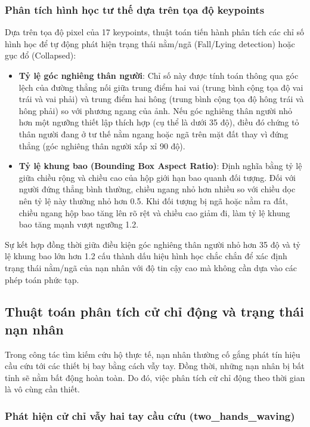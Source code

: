 \subsubsection{Phân tích hình học tư thế dựa trên tọa độ keypoints}

Dựa trên tọa độ pixel của 17 keypoints, thuật toán tiến hành phân tích các chỉ số hình học để tự động phát hiện trạng thái nằm/ngã (Fall/Lying detection) hoặc gục đổ (Collapsed):

\begin{itemize}
    \item \textbf{Tỷ lệ góc nghiêng thân người}: Chỉ số này được tính toán thông qua góc lệch của đường thẳng nối giữa trung điểm hai vai (trung bình cộng tọa độ vai trái và vai phải) và trung điểm hai hông (trung bình cộng tọa độ hông trái và hông phải) so với phương ngang của ảnh. Nếu góc nghiêng thân người nhỏ hơn một ngưỡng thiết lập thích hợp (cụ thể là dưới 35 độ), điều đó chứng tỏ thân người đang ở tư thế nằm ngang hoặc ngã trên mặt đất thay vì đứng thẳng (góc nghiêng thân người xấp xỉ 90 độ).
    \item \textbf{Tỷ lệ khung bao (Bounding Box Aspect Ratio)}: Định nghĩa bằng tỷ lệ giữa chiều rộng và chiều cao của hộp giới hạn bao quanh đối tượng. Đối với người đứng thẳng bình thường, chiều ngang nhỏ hơn nhiều so với chiều dọc nên tỷ lệ này thường nhỏ hơn 0.5. Khi đối tượng bị ngã hoặc nằm ra đất, chiều ngang hộp bao tăng lên rõ rệt và chiều cao giảm đi, làm tỷ lệ khung bao tăng mạnh vượt ngưỡng 1.2.
\end{itemize}

Sự kết hợp đồng thời giữa điều kiện góc nghiêng thân người nhỏ hơn 35 độ và tỷ lệ khung bao lớn hơn 1.2 cấu thành dấu hiệu hình học chắc chắn để xác định trạng thái nằm/ngã của nạn nhân với độ tin cậy cao mà không cần dựa vào các phép toán phức tạp.

\subsection{Thuật toán phân tích cử chỉ động và trạng thái nạn nhân}

Trong công tác tìm kiếm cứu hộ thực tế, nạn nhân thường cố gắng phát tín hiệu cầu cứu tới các thiết bị bay bằng cách vẫy tay. Đồng thời, những nạn nhân bị bất tỉnh sẽ nằm bất động hoàn toàn. Do đó, việc phân tích cử chỉ động theo thời gian là vô cùng cần thiết.

\subsubsection{Phát hiện cử chỉ vẫy hai tay cầu cứu (two\_hands\_waving)}

